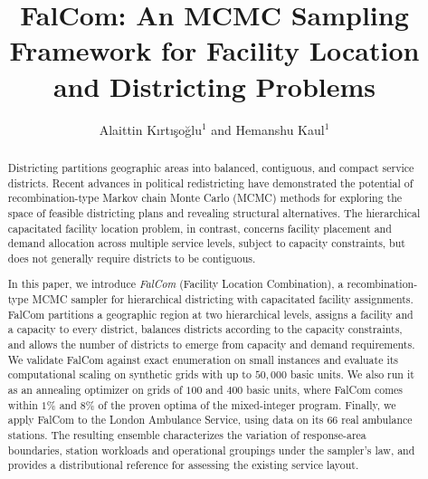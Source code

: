 \documentclass[11pt]{article}
\theoremstyle{definition}
\begin{document}
\linenumbers

\title{FalCom: An MCMC Sampling Framework for Facility Location and Districting Problems}
\author{Alaittin K\i rt\i \c{s}o\u{g}lu$^1$ and Hemanshu Kaul$^1$}


\date{}

\maketitle

\begin{abstract}
    Districting partitions geographic areas into balanced, contiguous, and compact 
    service districts. Recent advances in political redistricting have demonstrated 
    the potential of recombination-type Markov chain Monte Carlo (MCMC) methods for 
    exploring the space of feasible districting plans and revealing structural 
    alternatives. The hierarchical capacitated facility location problem, in 
    contrast, concerns facility placement and demand allocation across multiple 
    service levels, subject to capacity constraints, but does not generally require 
    districts to be contiguous.

    In this paper, we introduce \emph{FalCom} (Facility Location Combination), a 
    recombination-type MCMC sampler for hierarchical districting with capacitated 
    facility assignments. FalCom partitions a geographic region at two hierarchical 
    levels, assigns a facility and a capacity to every district, balances districts 
    according to the capacity constraints, and allows the number of districts to emerge 
    from capacity and demand requirements. We validate FalCom against exact enumeration 
    on small instances and evaluate its computational scaling on synthetic 
    grids with up to $50{,}000$ basic units. We also run it as an annealing optimizer 
    on grids of $100$ and $400$ basic units, where FalCom comes within $1\%$ and $8\%$ of the proven 
    optima of the mixed-integer program. 
    Finally, we apply FalCom to the London Ambulance Service, using data on its $66$ 
    real ambulance stations. The resulting ensemble characterizes the variation of 
    response-area boundaries, station workloads and operational groupings under the 
    sampler's law, and provides a distributional reference for assessing the existing 
    service layout.
\end{abstract}
\end{document}
